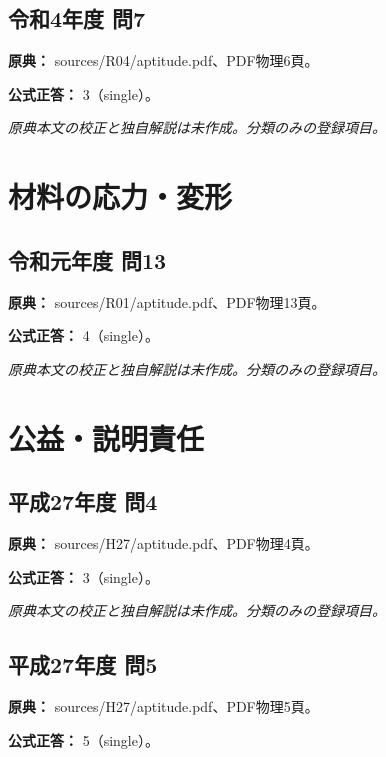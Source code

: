\subsection{令和4年度 問7}
\label{q:r04-reg-apt-07}

\noindent\textbf{原典：} sources/R04/aptitude.pdf、PDF物理6頁。

\textbf{公式正答：} 3（single）。

\par\textit{原典本文の校正と独自解説は未作成。分類のみの登録項目。}

\section{材料の応力・変形}

\subsection{令和元年度 問13}
\label{q:r01-reg-apt-13}

\noindent\textbf{原典：} sources/R01/aptitude.pdf、PDF物理13頁。

\textbf{公式正答：} 4（single）。

\par\textit{原典本文の校正と独自解説は未作成。分類のみの登録項目。}

\section{公益・説明責任}

\subsection{平成27年度 問4}
\label{q:h27-reg-apt-04}

\noindent\textbf{原典：} sources/H27/aptitude.pdf、PDF物理4頁。

\textbf{公式正答：} 3（single）。

\par\textit{原典本文の校正と独自解説は未作成。分類のみの登録項目。}

\subsection{平成27年度 問5}
\label{q:h27-reg-apt-05}

\noindent\textbf{原典：} sources/H27/aptitude.pdf、PDF物理5頁。

\textbf{公式正答：} 5（single）。

